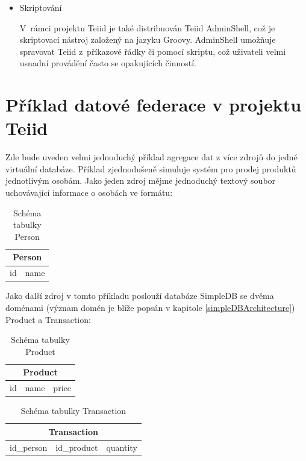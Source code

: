 \documentclass[oneside,12pt]{fithesis2}
\begin{document}
\begin{itemize}
\begin{itemize}
  \item Skriptování
  
  V~rámci projektu Teiid je také distribuován Teiid AdminShell, což je skriptovací nástroj založený na jazyku Groovy. AdminShell umožňuje spravovat Teiid z~příkazové řádky či pomocí skriptu, což uživateli velmi usnadní provádění často se opakujících činností.
  
  \end{itemize}

\end{itemize}

\section{Příklad datové federace v projektu Teiid}
Zde bude uveden velmi jednoduchý příklad agregace dat z více zdrojů do jedné virtuální databáze. Příklad zjednodušeně simuluje systém pro prodej produktů jednotlivým osobám. 
Jako jeden zdroj mějme jednoduchý textový soubor uchovávající informace o osobách ve formátu:
\begin{table}[h]
\centering
 \begin{tabular}{|c|c|}
 \hline
 \multicolumn{2}{|c|}{Person} \\
 \hline
 id & name \\
 \hline
\end{tabular}
  \caption{Schéma tabulky Person}
 \label{personTable}
\end{table}

Jako další zdroj v tomto příkladu poslouží databáze SimpleDB se dvěma doménami (význam domén je  blíže popsán v kapitole \ref{simpleDBArchitecture}) Product a Transaction:
\begin{table}[h]
\centering
\begin{tabular}{|c|c|c|}
 \hline
 \multicolumn{3}{|c|}{Product} \\
 \hline
 id & name & price \\
 \hline
\end{tabular}
  \caption{Schéma tabulky Product}
 \label{productTable}
\end{table}
\begin{table}[h]
\centering
\begin{tabular}{|c|c|c|}
 \hline
 \multicolumn{3}{|c|}{Transaction} \\
 \hline
 id\_person & id\_product &  quantity \\
 \hline
\end{tabular}
\caption{Schéma tabulky Transaction}
\label{transactionTable}
\end{table}
\end{document}
